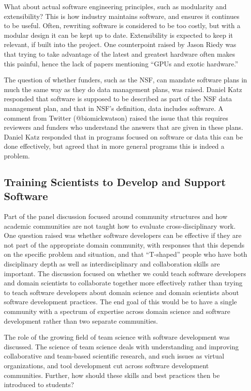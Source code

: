\documentclass[11pt, oneside]{amsart}
\begin{document}
What about actual software engineering principles, such as modularity and
extensibility? This is how industry maintains software, and ensures it continues
to be useful. Often, rewriting software is considered to be too costly, but
with a modular design it can be kept up to date. Extensibility is expected to keep
it relevant, if built into the project. One counterpoint raised by Jason Riedy
was that trying to take advantage of the latest and greatest hardware often
makes this painful, hence the lack of papers mentioning ``GPUs and exotic
hardware.''

The question of whether funders, such as the NSF, can mandate software plans in
much the same way as they do data management plans, was raised. Daniel Katz responded that
software is supposed to be described as part of the NSF data management plan,
and that in NSF's definition, data includes software. A comment from Twitter
(@biomickwatson) raised the issue that this requires reviewers and funders who
understand the answers that are given in these plans. Daniel Katz responded
that in programs focused on software or data this can be done effectively, but
agreed that in more general programs this is indeed a problem.


\subsection{Training Scientists to Develop and Support Software}
Part of the panel discussion focused around community structures and how academic communities are not taught how to evaluate cross-disciplinary work.
One question raised was whether software developers can be effective if they are not part
of the appropriate domain community, with responses that this depends on the
specific problem and situation, and that ``T-shaped'' people who have both disciplinary depth as well as interdisciplinary and collaboration skills are important.
The discussion focused on  whether we could teach software developers and domain scientists to
collaborate together more effectively rather than trying to teach software developers
about domain science and domain scientists about software development practices.
The end goal of this would be to have a single community with a spectrum of expertise across
domain science and software development rather than two separate communities.

The role of the growing field of team science with software development  was discussed. The science of team science
deals with understanding and improving collaborative and team-based scientific research, and such issues as virtual organizations,
and tool development cut across software development communities. Further, how should these skills and best practices then be
introduced to students?
\end{document}

